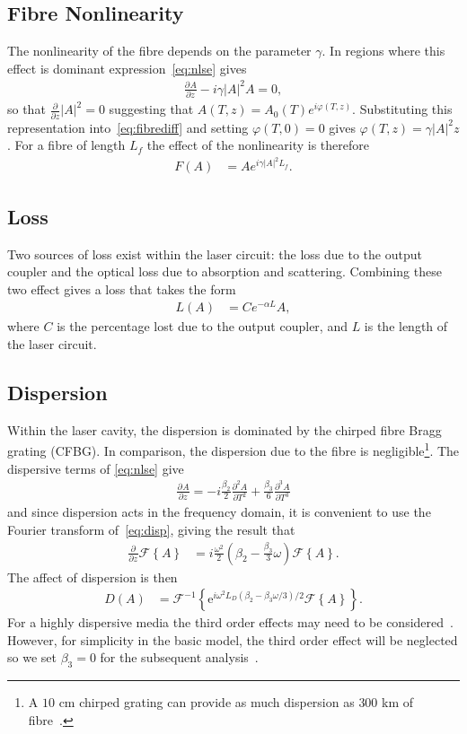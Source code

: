 \documentclass[12pt]{article}
\newcommand{\pdiff}[3][]{\frac{\partial^{#1}#2}{\partial{#3}^{#1}}}
\newcommand{\FT}[1]{\mathcal{F}\left\{ #1 \right\}}
\newcommand{\FTi}[1]{\mathcal{F}^{-1}\left\{ #1 \right\}}
\begin{document}
\subsection{Fibre Nonlinearity}
The nonlinearity of the fibre depends on the parameter $\gamma$. In regions where this effect is dominant expression~\eqref{eq:nlse} gives
\begin{align}
\label{eq:fibrediff}
	\pdiff{A}{z} - i \gamma |A|^2 A = 0,
\end{align}
so that $\frac{\partial}{\partial z} |A|^2 = 0$ suggesting that $A(T,z) = A_0(T) e^{i \varphi(T,z)}$. Substituting this representation into~\eqref{eq:fibrediff} and setting $\varphi(T,0)=0$ gives $\varphi(T,z) = \gamma |A|^2 z$. For a fibre of length $L_f$ the effect of the nonlinearity is therefore
\begin{align}
\label{eq:fibre}
	F(A) &= A e^{i \gamma |A|^2 L_f}.
\end{align}

\subsection{Loss}
Two sources of loss exist within the laser circuit: the loss due to the output coupler and the optical loss due to absorption and scattering. Combining these two effect gives a loss that takes the form
\begin{align}
\label{eq:fibreloss}
	L(A) &= C e^{- \alpha L}A,
\end{align}
where $C$ is the percentage lost due to the output coupler, and $L$ is the length of the laser circuit.

\subsection{Dispersion}
Within the laser cavity, the dispersion is dominated by the chirped fibre Bragg grating (CFBG). In comparison, the dispersion due to the fibre is negligible\footnote{A $10$ cm chirped grating can provide as much dispersion as $300$ km of fibre~\cite{agrawal2002}.}. The dispersive terms of \eqref{eq:nlse} give
\begin{align}
\label{eq:disp}
	\pdiff{A}{z} = -i \frac{\beta_2}{2} \pdiff[2]{A}{T} + \frac{\beta_3}{6} \pdiff[3]{A}{T}
\end{align}
and since dispersion acts in the frequency domain, it is convenient to use the Fourier transform of~\eqref{eq:disp}, giving the result that
\begin{align*}
	\pdiff{}{z}\FT{A} &= i\frac{\omega^2}{2}\left(\beta_2 - \frac{\beta_3}{3} \omega\right) \FT{A}.
\end{align*}
The affect of dispersion is then
\begin{align}
\label{eq:dispersion}
	D(A) &= \FTi{\textrm{e}^{i \omega^2 L_D(\beta_2 - \beta_3 \omega/3)/2} \FT{A}}.
\end{align}
For a highly dispersive media the third order effects may need to be considered~\cite{agrawal2013, litchinitser}. However, for simplicity in the basic model, the third order effect will be neglected so we set $\beta_3=0$ for the subsequent analysis~\cite{agrawal2013, ferreira}.
\end{document}
